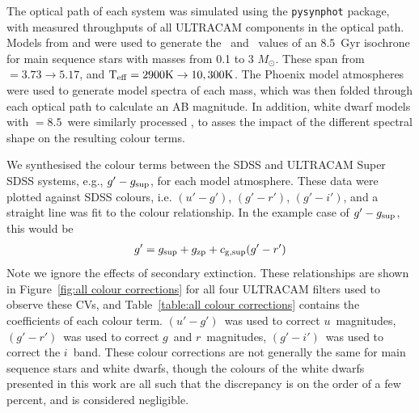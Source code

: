 The optical path of each system was simulated using the \texttt{pysynphot} package, with measured throughputs of all ULTRACAM components in the optical path. Models from \citet{Dotter2016} and \citet{Choi2016} were used to generate the \teff\ and \logg\ values of an $8.5$\ Gyr isochrone for main sequence stars with masses from 0.1 to 3 $M_\odot$. These span from \logg $= 3.73 \to 5.17$, and $\rm{T_{eff}} = 2900K \to 10,300K$. The Phoenix model atmospheres \citep{allard2012} were used to generate model spectra of each mass, which was then folded through each optical path to calculate an AB magnitude. In addition, white dwarf models with \logg$=8.5$\ were similarly processed \citep{koester2010, tremblay2009}, to asses the impact of the different spectral shape on the resulting colour terms.

We synthesised the colour terms between the SDSS and ULTRACAM Super SDSS systems, e.g., $g'-g_{\rm sup}$, for each model atmosphere. These data were plotted against SDSS colours, i.e. $(u'-g')$, $(g'-r')$, $(g'-i')$, and a straight line was fit to the colour relationship. In the example case of $g'-g_{\rm sup}$, this would be
\begin{align*}
    g' &= g_{\rm sup} + g_{\rm zp} + c_{\rm g, sup}(g'-r') \\
\end{align*}
Note we ignore the effects of secondary extinction. 
These relationships are shown in Figure~\ref{fig:all colour corrections} for all four ULTRACAM filters used to observe these CVs, and Table~\ref{table:all colour corrections} contains the coefficients of each colour term.
$(u'-g')$\ was used to correct $u$\ magnitudes, $(g'-r')$\ was used to correct $g$\ and $r$\ magnitudes, $(g'-i')$\ was used to correct the $i$\ band.
These colour corrections are not generally the same for main sequence stars and white dwarfs, though the colours of the white dwarfs presented in this work are all such that the discrepancy is on the order of a few percent, and is considered negligible.

